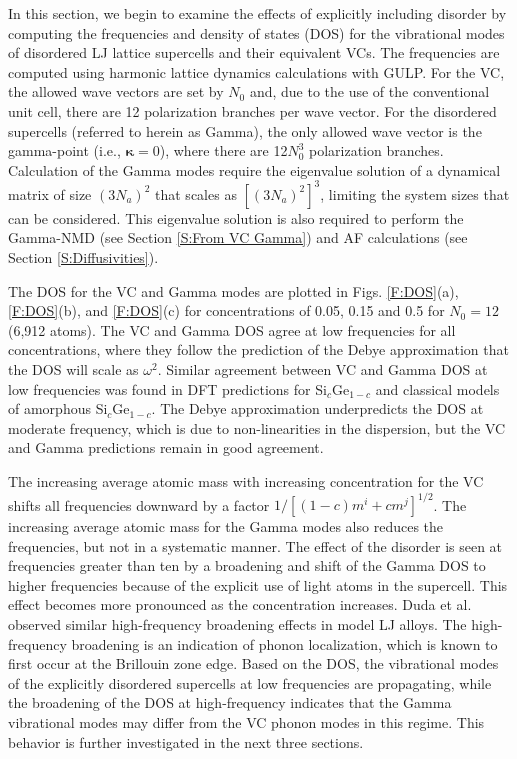 \documentclass[12pt,twocolumn,iop]{/usr/share/texmf/tex/latex/iop/iopart}[/usr/share/texmf/tex/latex/iop/]
\begin{document}
In this section, we begin to examine the effects of explicitly including 
disorder by computing the frequencies and density of states (DOS)  
for the vibrational modes of disordered LJ lattice supercells and their 
equivalent VCs. The frequencies 
are computed using harmonic lattice dynamics calculations with  
GULP.\cite{gale_general_2003}  For the 
VC, the allowed wave vectors are set by $N_0$ and, due to the use of the 
conventional unit cell, there are 12 
polarization branches per wave vector.  
For the disordered supercells (referred to herein as Gamma),
the only allowed wave vector is the gamma-point (i.e., $\pmb{\kappa}=0$),  
where there are 12$N_0^3$ polarization branches. Calculation of the 
Gamma modes require the eigenvalue solution of a dynamical matrix of size 
$(3N_a)^2$ that scales as $[(3N_a)^2]^3$, limiting the system 
sizes that can be considered. This eigenvalue solution is also 
required to perform the Gamma-NMD (see Section \ref{S:From VC Gamma})  
and AF calculations (see Section \ref{S:Diffusivities}). 

The DOS for the VC and Gamma modes are plotted in Figs. \ref{F:DOS}(a), 
\ref{F:DOS}(b), and \ref{F:DOS}(c) 
for concentrations of 0.05, 0.15 and 0.5 for 
$N_0=12$ (6,912 atoms). The VC and Gamma DOS 
agree at low frequencies for all concentrations, 
where they follow the prediction of the Debye approximation that 
the DOS will scale as $\omega^2$.\cite{ashcroft_solid_1976} 
Similar agreement between VC and Gamma DOS at low frequencies 
was found in DFT predictions 
for Si$_c$Ge$_{1-c}$\cite{garg_role_2011} and 
classical models of amorphous Si$_c$Ge$_{1-c}$.
\cite{bouchard_vibrational_1988} The Debye approximation 
underpredicts the DOS at moderate frequency, which is due to 
non-linearities in the dispersion,\cite{ashcroft_solid_1976} but the 
VC and Gamma predictions remain in good agreement. 

The increasing average atomic  
mass with increasing concentration for the VC shifts all   
frequencies downward by a factor $1/[(1-c)m^i + cm^j]^{1/2}$. 
The increasing average atomic 
mass for the Gamma modes also reduces the frequencies, but not in a 
systematic manner. 
The effect of the disorder is seen at frequencies greater than 
ten by a broadening and shift of the Gamma DOS to higher frequencies 
because of the explicit use of light atoms in the supercell. This effect 
becomes more pronounced as the concentration increases.  
Duda et al. 
observed similar high-frequency broadening effects in model LJ alloys.
\cite{duda_reducing_2011} The high-frequency broadening is an indication 
of phonon localization, which is known to first occur at the 
Brillouin zone edge.\cite{chu_effect_1989} 
Based on the DOS, the vibrational modes of the explicitly disordered 
supercells at low frequencies are propagating, while the broadening 
of the DOS at high-frequency indicates that the Gamma 
vibrational modes may differ from the VC phonon modes in this regime. 
This behavior is further investigated in the next three sections. 
\end{document}
